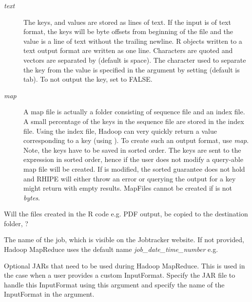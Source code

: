 \documentclass[letterpaper,10pt,english]{sphinxmanual}
\begin{document}
\begin{description}
\begin{description}
\item[{\emph{text}}] \leavevmode
The keys, and values are stored as lines of text. If the input is
of text format, the keys will be byte offsets from beginning of the file and
the value is a line of text without the trailing newline. R objects written
to a text output format are written as one line. Characters are quoted and
vectors are separated by  (default is
space). The character used to separate the key from the value is specified
in the  argument by setting 
(default is tab). To not output the key, set  to FALSE.

\item[{\emph{map}}] \leavevmode
A map file is actually a folder consisting of sequence file and an
index file. A small percentage of the keys in the sequence file are stored in
the index file. Using the index file, Hadoop can very quickly return a value
corresponding to a key (using ). To create such an output
format, use  \emph{map}. Note, the keys have to be saved in sorted order. The
keys are sent to the  expression in sorted order, hence if the
user does not modify  a query-able map file will be created. If
 is modified, the sorted guarantee does not hold and RHIPE
will either throw an error or querying the output for a key might return with
empty results. MapFiles cannot be created if  is not \emph{bytes}.

\end{description}

\item[{\code{copyFiles}}] \leavevmode
Will the files created in the R code e.g. PDF output, be copied
to the destination folder, ?

\item[{\code{jobname}}] \leavevmode
The name of the job, which is visible on the Jobtracker
website. If not provided, Hadoop MapReduce uses the default name
\emph{job\_date\_time\_number} e.g. 

\item[{\code{jarfiles}}] \leavevmode
Optional JARs that need to be used during Hadoop MapReduce.
This is used in the case when a user provides a custom InputFormat. Specify the
JAR file to handle this InputFormat using this argument and specify the name of
the InputFormat in the  argument.


\end{description}
\end{document}
